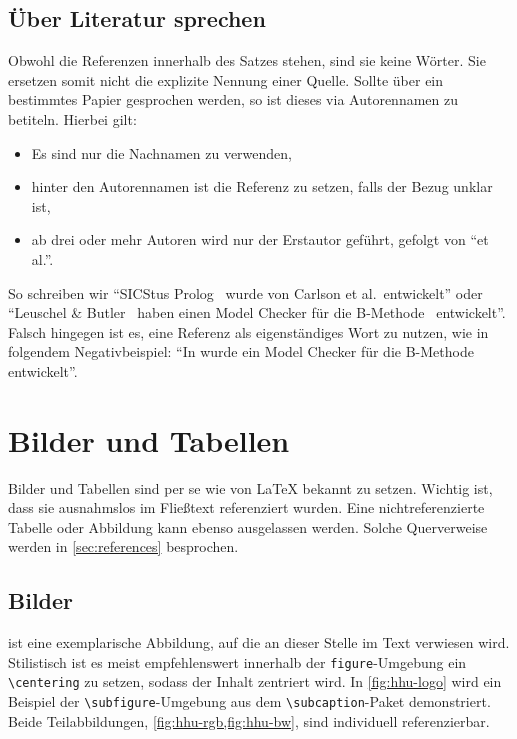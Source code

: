 \subsection{Über Literatur sprechen}

Obwohl die Referenzen innerhalb des Satzes stehen, sind sie keine Wörter.
Sie ersetzen somit nicht die explizite Nennung einer Quelle.
Sollte über ein bestimmtes Papier gesprochen werden, so ist dieses via
Autorennamen zu betiteln. Hierbei gilt:
\begin{itemize}
  \item Es sind nur die Nachnamen zu verwenden,
  \item hinter den Autorennamen ist die Referenz zu setzen,
    falls der Bezug unklar ist,
  \item ab drei oder mehr Autoren wird nur der Erstautor geführt, gefolgt von
    \enquote{et al.}.
\end{itemize}

So schreiben wir
\enquote{SICStus Prolog~\cite{carlsson1988sicstus} wurde von Carlson et al.\
  entwickelt}
oder
\enquote{Leuschel \& Butler~\cite{leuschel2003prob} haben einen Model Checker für die
  B-Methode~\cite{abrial1996b} entwickelt}.
Falsch hingegen ist es, eine Referenz als eigenständiges Wort zu nutzen, wie in
folgendem Negativbeispiel:
\enquote{In \cite{leuschel2003prob} wurde ein Model Checker für die B-Methode entwickelt}.



\section{Bilder und Tabellen}

Bilder und Tabellen sind per se wie von \LaTeX{} bekannt zu setzen.
Wichtig ist, dass sie ausnahmslos im Fließtext referenziert wurden.
Eine nichtreferenzierte Tabelle oder Abbildung kann ebenso ausgelassen werden.
Solche Querverweise werden in \cref{sec:references} besprochen.


\subsection{Bilder}%
\label{sec:figures}

 ist eine exemplarische Abbildung, auf die an dieser
Stelle im Text verwiesen wird.
Stilistisch ist es meist empfehlenswert innerhalb der
\texttt{figure}-Umgebung ein \texttt{\textbackslash{}centering} zu setzen,
sodass der Inhalt zentriert wird.
In \cref{fig:hhu-logo} wird ein Beispiel der
\texttt{\textbackslash{}subfigure}-Umgebung aus dem
\texttt{\textbackslash{}subcaption}-Paket demonstriert.
Beide Teilabbildungen, \cref{fig:hhu-rgb,fig:hhu-bw},
sind individuell referenzierbar.

